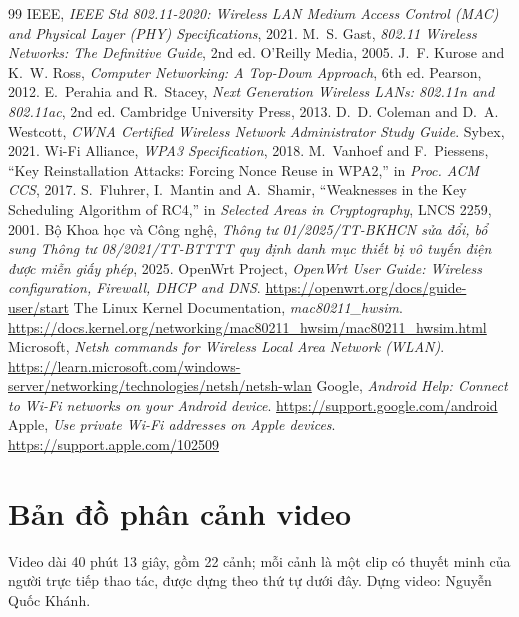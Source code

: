 \documentclass[12pt,a4paper]{article}
\numberwithin{figure}{section}
\numberwithin{table}{section}
\begin{document}
\clearpage
{}
{}
\begin{thebibliography}{99}\small
   IEEE, \emph{IEEE Std 802.11-2020: Wireless LAN Medium
  Access Control (MAC) and Physical Layer (PHY) Specifications}, 2021.
   M.~S. Gast, \emph{802.11 Wireless Networks: The Definitive
  Guide}, 2nd ed. O'Reilly Media, 2005.
   J.~F. Kurose and K.~W. Ross, \emph{Computer Networking:
  A Top-Down Approach}, 6th ed. Pearson, 2012.
   E.~Perahia and R.~Stacey, \emph{Next Generation Wireless
  LANs: 802.11n and 802.11ac}, 2nd ed. Cambridge University Press, 2013.
   D.~D. Coleman and D.~A. Westcott, \emph{CWNA Certified
  Wireless Network Administrator Study Guide}. Sybex, 2021.
   Wi-Fi Alliance, \emph{WPA3 Specification}, 2018.
   M.~Vanhoef and F.~Piessens, ``Key Reinstallation Attacks:
  Forcing Nonce Reuse in WPA2,'' in \emph{Proc. ACM CCS}, 2017.
   S.~Fluhrer, I.~Mantin and A.~Shamir, ``Weaknesses in the Key
  Scheduling Algorithm of RC4,'' in \emph{Selected Areas in Cryptography},
  LNCS 2259, 2001.
   Bộ Khoa học và Công nghệ, \emph{Thông tư 01/2025/TT-BKHCN
    sửa đổi, bổ sung Thông tư 08/2021/TT-BTTTT quy định danh mục thiết bị vô
  tuyến điện được miễn giấy phép}, 2025.
   OpenWrt Project, \emph{OpenWrt User Guide: Wireless
  configuration, Firewall, DHCP and DNS}.
  \url{https://openwrt.org/docs/guide-user/start}
   The Linux Kernel Documentation, \emph{mac80211\_hwsim}.
  \url{https://docs.kernel.org/networking/mac80211_hwsim/mac80211_hwsim.html}
   Microsoft, \emph{Netsh commands for Wireless Local Area
  Network (WLAN)}. \url{https://learn.microsoft.com/windows-server/networking/technologies/netsh/netsh-wlan}
   Google, \emph{Android Help: Connect to Wi-Fi networks on
  your Android device}. \url{https://support.google.com/android}
   Apple, \emph{Use private Wi-Fi addresses on Apple devices}.
  \url{https://support.apple.com/102509}
\end{thebibliography}

\clearpage
\appendix
\renewcommand{\thesection}{\Alph{section}}
\section{Bản đồ phân cảnh video}
\label{app:video}
Video dài 40 phút 13 giây, gồm 22 cảnh; mỗi cảnh là một clip có thuyết minh
của người trực tiếp thao tác, được dựng theo thứ tự dưới đây. Dựng video:
Nguyễn Quốc Khánh.
\end{document}
